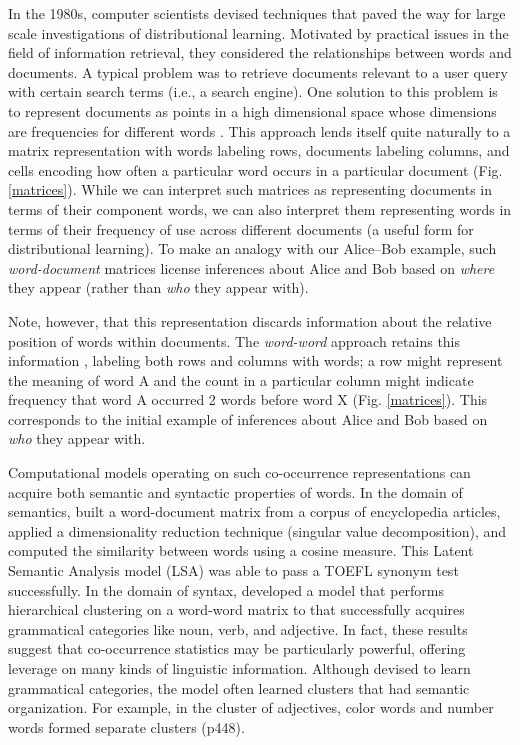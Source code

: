\documentclass[man,longtable,floatsintext]{my-apa6}
\begin{document}
In the 1980s, computer scientists devised techniques that paved the way for large scale investigations of distributional learning. Motivated by practical issues in the field of information retrieval, they considered the relationships between words and documents. A typical problem was to retrieve documents relevant to a user query with certain search terms (i.e., a search engine). One solution to this problem is to represent documents as points in a high dimensional space whose dimensions are frequencies for different words \citep{salton1983}. This approach lends itself quite naturally to a matrix representation with words labeling rows, documents labeling columns, and cells encoding how often a particular word occurs in a particular document (Fig. \ref{matrices}). While we can interpret such matrices as representing documents in terms of their component words, we can also interpret them representing words in terms of their frequency of use across different documents (a useful form for distributional learning). To make an analogy with our Alice--Bob example, such \emph{word-document} matrices license inferences about Alice and Bob based on \emph{where} they appear (rather than \emph{who} they appear with).

Note, however, that this representation discards information about the relative position of words within documents. The \emph{word-word} approach retains this information \citep{church1990, schutze1992}, labeling both rows and columns with words; a row might represent the meaning of word A and the count in a particular column might indicate frequency that word A occurred 2 words before word X (Fig. \ref{matrices}). This corresponds to the initial example of inferences about Alice and Bob based on \emph{who} they appear with.

Computational models operating on such co-occurrence representations can acquire both semantic and syntactic properties of words. In the domain of semantics, \citet{landauer1997} built a word-document matrix from a corpus of encyclopedia articles, applied a dimensionality reduction technique (singular value decomposition), and computed the similarity between words using a cosine measure. This Latent Semantic Analysis model (LSA) was able to pass a TOEFL synonym test successfully. In the domain of syntax, \citet{redington1998} developed a model that performs hierarchical clustering on a word-word matrix to that successfully acquires grammatical categories like noun, verb, and adjective. In fact, these results suggest that co-occurrence statistics may be particularly powerful, offering leverage on many kinds of linguistic information. Although devised to learn grammatical categories, the model often learned clusters that had semantic organization. For example, in the cluster of adjectives, color words and number words formed separate clusters (p448).
\end{document}
